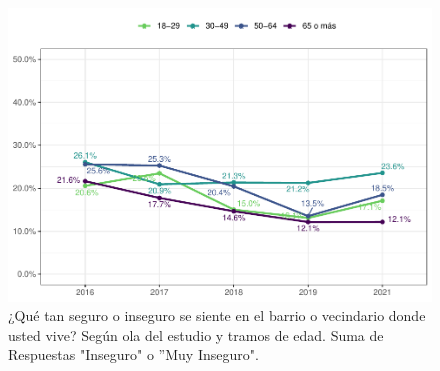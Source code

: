 \documentclass[
  12pt,
]{book}
\begin{document}
\begin{figure}

{\centering \includegraphics{reporte-elsoc_files/figure-latex/seguri-edad-1} 

}

\caption{¿Qué tan seguro o inseguro se siente en el barrio o vecindario donde usted vive? Según ola del estudio y tramos de edad. Suma de Respuestas "Inseguro" o ”Muy Inseguro".}\label{fig:seguri-edad}
\end{figure}
\end{document}
